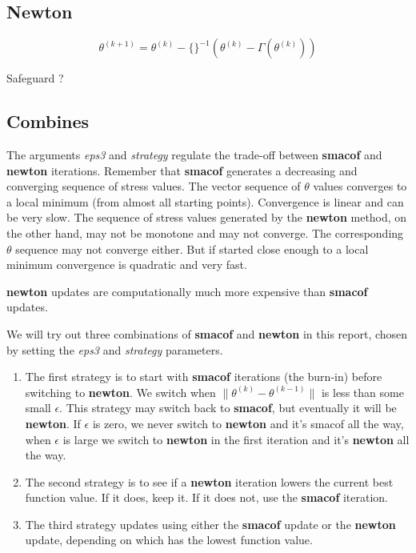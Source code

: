 \documentclass[
  12pt,
]{article}
\providecommand{\tightlist}{%
  \setlength{\itemsep}{0pt}\setlength{\parskip}{0pt}}
\begin{document}
\subsection{Newton}\label{newton}

\[
\theta^{(k+1)}=\theta^{(k)}-\{\}^{-1}(\theta^{(k)}-\Gamma(\theta^{(k)}))
\]

Safeguard ?

\subsection{Combines}\label{combines}

The arguments \emph{eps3} and \emph{strategy} regulate the trade-off between
\textbf{smacof} and \textbf{newton} iterations. Remember that \textbf{smacof} generates a decreasing and converging sequence of stress values. The vector sequence of \(\theta\) values converges to a local minimum (from almost all starting points). Convergence is linear and can be very slow. The sequence of stress values generated by the \textbf{newton} method, on the other hand, may not be monotone and may not converge. The corresponding \(\theta\) sequence may not converge either. But if started close enough to a local minimum convergence is quadratic and very fast.

\textbf{newton} updates are computationally much more expensive than \textbf{smacof} updates.

We will try out three combinations of \textbf{smacof} and \textbf{newton} in this report, chosen by
setting the \emph{eps3} and \emph{strategy} parameters.

\begin{enumerate}
\def\labelenumi{\arabic{enumi}.}
\tightlist
\item
  The first strategy is to start with \textbf{smacof} iterations (the burn-in) before switching to \textbf{newton}. We switch when \(\|\theta^{(k)}-\theta^{(k-1)}\|\) is less than some small \(\epsilon\). This strategy may switch back to \textbf{smacof}, but eventually it will be \textbf{newton}. If \(\epsilon\) is zero,
  we never switch to \textbf{newton} and it's smacof all the way, when \(\epsilon\) is large we switch to
  \textbf{newton} in the first iteration and it's \textbf{newton} all the way.
\item
  The second strategy is to see if a \textbf{newton} iteration lowers the current best function value. If it does, keep it. If it does not, use the \textbf{smacof} iteration.
\item
  The third strategy updates using either the \textbf{smacof} update or the \textbf{newton}
  update, depending on which has the lowest function value.
\end{enumerate}
\end{document}
